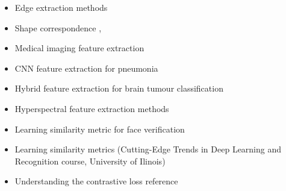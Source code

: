 \documentclass[conference]{IEEEtran}
\begin{document}
\begin{itemize}

	\item Edge extraction methods \cite{b1}
	\item Shape correspondence \cite{b2}, \cite{b3}
	\item Medical imaging feature extraction \cite{b4}
	\item CNN feature extraction for pneumonia \cite{b5}
	\item Hybrid feature extraction for brain tumour classification \cite{b6}
	\item Hyperspectral feature extraction methods \cite {b7}
	\item Learning similarity metric for face verification \cite{b8}
	\item Learning similarity metrics (Cutting-Edge Trends in Deep Learning and Recognition course, University of Ilinois) \cite{b9}
	\item Understanding the contrastive loss reference \cite{b9}

\end{itemize}
\end{document}
